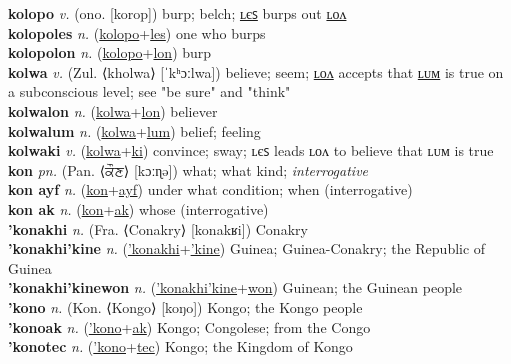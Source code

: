 \textbf{kolopo} \textit{v.} (ono. [korop])
burp; belch; \hyperref[kolopoles]{ʟєꜱ} burps out \hyperref[kolopolon]{ʟᴏᴧ} \label{kolopo} \\
\textbf{kolopoles} \textit{n.} (\hyperref[kolopo]{kolopo}+\hyperref[les]{les})
one who burps \label{kolopoles} \\
\textbf{kolopolon} \textit{n.} (\hyperref[kolopo]{kolopo}+\hyperref[lon]{lon})
burp \label{kolopolon} \\
\textbf{kolwa} \textit{v.} (Zul. ⟨kholwa⟩ [ˈkʰɔːlwa])
believe; seem; \hyperref[kolwalon]{ʟᴏᴧ} accepts that \hyperref[kolwalum]{ʟᴜᴍ} is true on a subconscious level; see "be sure" and "think" \label{kolwa} \\
\textbf{kolwalon} \textit{n.} (\hyperref[kolwa]{kolwa}+\hyperref[lon]{lon})
believer \label{kolwalon} \\
\textbf{kolwalum} \textit{n.} (\hyperref[kolwa]{kolwa}+\hyperref[lum]{lum})
belief; feeling \label{kolwalum} \\
\textbf{kolwaki} \textit{v.} (\hyperref[kolwa]{kolwa}+\hyperref[ki]{ki})
convince; sway; ʟєꜱ leads ʟᴏᴧ to believe that ʟᴜᴍ is true \label{kolwaki} \\
\textbf{kon} \textit{pn.} (Pan. ⟨ਕੌਣ⟩ [kɔːɳə])
what; what kind; \textit{interrogative} \label{kon} \\
\textbf{kon ayf} \textit{n.} (\hyperref[kon]{kon}+\hyperref[yf]{ayf})
under what condition; when (interrogative) \label{kon ayf} \\
\textbf{kon ak} \textit{n.} (\hyperref[kon]{kon}+\hyperref[k]{ak})
whose (interrogative) \label{kon ak} \\
\textbf{'konakhi} \textit{n.} (Fra. ⟨Conakry⟩ [konakʁi])
Conakry \label{'konakhi} \\
\textbf{'konakhi'kine} \textit{n.} (\hyperref['konakhi]{'konakhi}+\hyperref['kine]{'kine})
Guinea; Guinea-Conakry; the Republic of Guinea \label{'konakhi'kine} \\
\textbf{'konakhi'kinewon} \textit{n.} (\hyperref['konakhi'kine]{'konakhi'kine}+\hyperref[won]{won})
Guinean; the Guinean people \label{'konakhi'kinewon} \\
\textbf{'kono} \textit{n.} (Kon. ⟨Kongo⟩ [koŋo])
Kongo; the Kongo people \label{'kono} \\
\textbf{'konoak} \textit{n.} (\hyperref['kono]{'kono}+\hyperref[ak]{ak})
Kongo; Congolese; from the Congo \label{'konoak} \\
\textbf{'konotec} \textit{n.} (\hyperref['kono]{'kono}+\hyperref[tec]{tec})
Kongo; the Kingdom of Kongo \label{'konotec} \\
